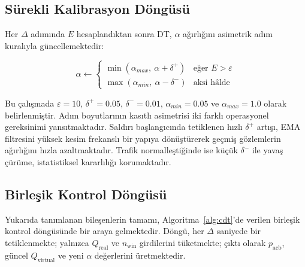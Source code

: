 \documentclass[conference]{IEEEtran}
\newcommand{\qreal}{Q_{\mathrm{real}}}
\newcommand{\qvirt}{Q_{\mathrm{virtual}}}
\newcommand{\pacb}{p_{\mathrm{acb}}}
\begin{document}
\subsection{Sürekli Kalibrasyon Döngüsü}

Her $\Delta$ adımında $E$ hesaplandıktan sonra DT, $\alpha$ ağırlığını asimetrik
adım kuralıyla güncellemektedir:

\begin{equation}
\alpha \leftarrow \begin{cases}
    \min(\alpha_{max},\ \alpha + \delta^{+}) & \text{eğer } E > \varepsilon \\
    \max(\alpha_{min},\ \alpha - \delta^{-}) & \text{aksi hâlde}
\end{cases}
\label{eq:calibration}
\end{equation}

\noindent Bu çalışmada $\varepsilon = 10$, $\delta^{+} = 0.05$,
$\delta^{-} = 0.01$, $\alpha_{min} = 0.05$ ve $\alpha_{max} = 1.0$ olarak
belirlenmiştir. Adım boyutlarının kasıtlı asimetrisi iki farklı operasyonel
gereksinimi yansıtmaktadır. Saldırı başlangıcında tetiklenen hızlı $\delta^{+}$
artışı, EMA filtresini yüksek kesim frekanslı bir yapıya dönüştürerek geçmiş
gözlemlerin ağırlığını hızla azaltmaktadır. Trafik normalleştiğinde ise küçük
$\delta^{-}$ ile yavaş çürüme, istatistiksel kararlılığı korumaktadır.

\subsection{Birleşik Kontrol Döngüsü}

Yukarıda tanımlanan bileşenlerin tamamı, Algoritma~\ref{alg:cdt}'de verilen
birleşik kontrol döngüsünde bir araya gelmektedir. Döngü, her $\Delta$
saniyede bir tetiklenmekte; yalnızca $\qreal$ ve $n_{\mathrm{win}}$ girdilerini
tüketmekte; çıktı olarak $\pacb$, güncel $\qvirt$ ve yeni $\alpha$ değerlerini
üretmektedir.
\end{document}
